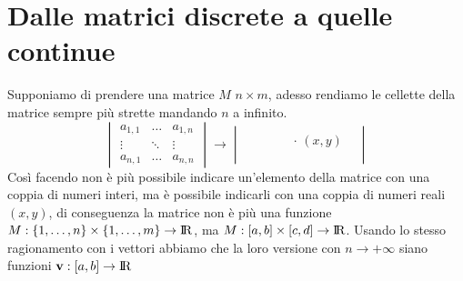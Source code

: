 \documentclass[11pt,a4paper]{report}
\newcommand{\vettore}[1]{\mathbf{#1}}
\theoremstyle{definition}
\theoremstyle{plain}
\theoremstyle{plain}
\begin{document}
		\section{Dalle matrici discrete a quelle continue}
			Supponiamo di prendere una matrice $M$ $ n \times m$, adesso rendiamo le cellette della matrice sempre più strette mandando $n$ a infinito.
			\begin{equation}
				\begin{vmatrix}
					a_{1,1} & \dots & a_{1,n} \\
					\vdots	&	\ddots&	\vdots	\\
					a_{n,1} & \dots & a_{n,n} 
				\end{vmatrix}
				\longrightarrow
				\begin{vmatrix}
					&\quad & & \\
					&\ &\quad \cdot \, (x,y) & \\
					& & & \\
				\end{vmatrix}
			\end{equation}
			Così facendo non è più possibile indicare un'elemento della matrice con una coppia di numeri interi, ma è possibile indicarli con una coppia di numeri reali $(x,y)$, di  conseguenza la matrice non è più una funzione $M:\{1,\dots,n\}\times\{1,\dots,m\} \rightarrow \rm I\!R$, ma $M:[a,b]\times [c,d]\rightarrow \rm I\!R$.\newline
			Usando lo stesso ragionamento con i vettori abbiamo che la loro versione con $n\rightarrow +\infty$ siano funzioni $\vettore v:[a,b]\rightarrow \rm I\!R$ 
		
		
\end{document}
